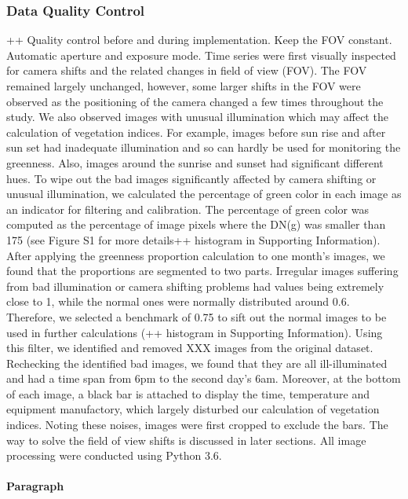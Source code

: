 \documentclass{article}
\begin{document}
\subsubsection{Data Quality Control}
++ Quality control before and during implementation. Keep the FOV constant. Automatic aperture and exposure mode. 
Time series were first visually inspected for camera shifts and the related changes in field of view (FOV). The FOV remained largely unchanged, however, some larger shifts in the FOV were observed as the positioning of the camera changed a few times throughout the study. We also observed images with unusual illumination which may affect the calculation of vegetation indices. For example, images before sun rise and after sun set had inadequate illumination and so can hardly be used for monitoring the greenness. Also, images around the sunrise and sunset had significant different hues. 
To wipe out the bad images significantly affected by camera shifting or unusual illumination, we calculated the percentage of green color in each image as an indicator for filtering and calibration. The percentage of green color was computed as the percentage of image pixels where the DN(g) was smaller than 175 (see Figure S1 for more details++ histogram in Supporting Information). After applying the greenness proportion calculation to one month’s images, we found that the proportions are segmented to two parts. Irregular images suffering from bad illumination or camera shifting problems had values being extremely close to 1, while the normal ones were normally distributed around 0.6. Therefore, we selected a benchmark of 0.75 to sift out the normal images to be used in further calculations (++ histogram in Supporting Information). Using this filter, we identified and removed XXX images  from the original dataset. Rechecking the identified bad images, we found that they are all ill-illuminated and had a time span from 6pm to the second day’s 6am.
Moreover, at the bottom of each image, a black bar is attached to display the time, temperature and equipment manufactory, which largely disturbed our calculation of vegetation indices. Noting these noises, images were first cropped to exclude the bars. The way to solve the field of view shifts is discussed in later sections.
All image processing were conducted using Python 3.6. 




\paragraph{Paragraph}
\end{document}
